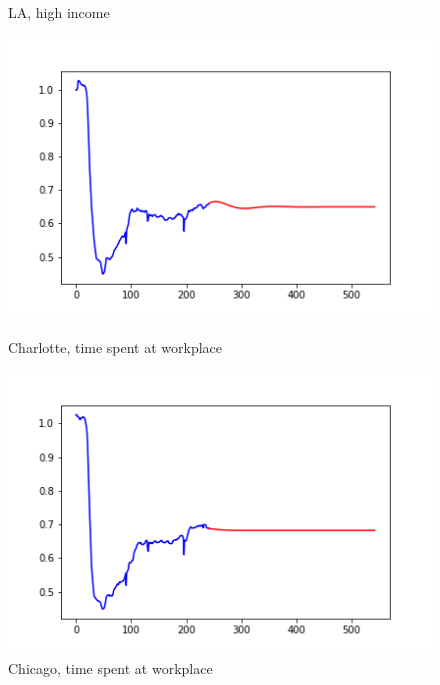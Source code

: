 \documentclass{article}
\begin{document}
\begin{figure}[ht]
\begin{minipage}[b]{0.3\linewidth}
\caption{LA, high income}
\end{minipage}
\end{figure}

\begin{figure}[ht]
\begin{minipage}[b]{0.3\linewidth}
\centering
\includegraphics[width=\textwidth]{Charlotte_time_at_workplace.png}
\caption{Charlotte, time spent at workplace}
\end{minipage}
\hspace{0.5cm}
\begin{minipage}[b]{0.3\linewidth}
\centering
\includegraphics[width=\textwidth]{Chicago_time_at_workplace.png}
\caption{Chicago, time spent at workplace}
\end{minipage}
\hspace{0.5cm}
\begin{minipage}[b]{0.3\linewidth}
\centering

\end{minipage}
\end{figure}
\end{document}
